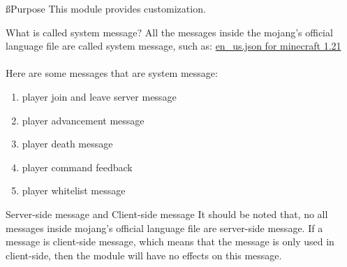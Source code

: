 
\ss{Purpose}
This module provides  customization.

\begin{note}{What is called system message?}
    All the messages inside the mojang's official language file are called system message, such as: \href{https://github.com/sakurawald/fuji-fabric/blob/dev/.github/files/en_us.json}{en\_us.json for minecraft 1.21}
    \\
    \\
    Here are some messages that are system message:
    \begin{enumerate}
        \item player join and leave server message
        \item player advancement message
        \item player death message
        \item player command feedback
        \item player whitelist message
    \end{enumerate}
\end{note}

\begin{note}{Server-side message and Client-side message}
    It should be noted that, no all messages inside mojang's official language file are server-side message.
    If a message is client-side message, which means that the message is only used in client-side, then the module will have no effects on this message.
\end{note}